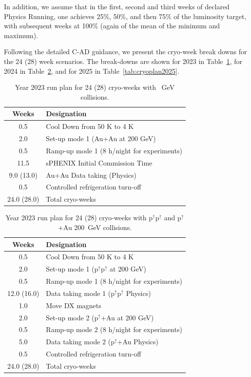 In addition, we assume that in the first, second and third weeks of declared Physics Running, one achieves 25\%, 50\%, and then 75\% of the luminosity target, with subsequent weeks at 100\% (again of the mean of the minimum and maximum).

Following the detailed C-AD guidance, we present the cryo-week break downs for the 24 (28) week scenarios.   
The break-downs are shown for 2023 in Table~\ref{tab:cryoplan2023}, for 2024 in Table~\ref{tab:cryoplan2024}, and for
2025 in Table~\ref{tab:cryoplan2025}.

\begin{table}
\centering
\begin{tabular}{ | c | l | }
\hline
Weeks & Designation \\ \hline
0.5  & Cool Down from 50 K to 4 K \\ \hline
2.0  & Set-up mode 1 (Au+Au at 200 GeV) \\ \hline
0.5  & Ramp-up mode 1 (8 h/night for experiments) \\ \hline
11.5  & sPHENIX Initial Commission Time \\ \hline
9.0 (13.0) & Au+Au Data taking (Physics) \\ \hline
0.5  & Controlled refrigeration turn-off \\ \hline \hline \hline
24.0 (28.0) & Total cryo-weeks \\
\hline
\end{tabular}
\caption{Year 2023 run plan for 24 (28) cryo-weeks with ~GeV collisions.\label{tab:cryoplan2023}}
\end{table}

\begin{table}
\centering
\begin{tabular}{ | c | l | }
\hline
Weeks & Designation \\ \hline
0.5  & Cool Down from 50 K to 4 K \\ \hline
2.0  & Set-up mode 1 (p$^{\uparrow}$p$^{\uparrow}$ at 200 GeV) \\ \hline
0.5  & Ramp-up mode 1 (8 h/night for experiments) \\ \hline
12.0 (16.0) & Data taking mode 1 (p$^{\uparrow}$p$^{\uparrow}$ Physics) \\ \hline
1.0  & Move DX magnets \\ \hline
2.0  & Set-up mode 2 (p$^{\uparrow}$+Au at 200 GeV) \\ \hline
0.5  & Ramp-up mode 2 (8 h/night for experiments) \\ \hline
5.0 & Data taking mode 2 (p$^{\uparrow}$+Au Physics) \\ \hline
0.5  & Controlled refrigeration turn-off \\ \hline \hline \hline
24.0 (28.0) & Total cryo-weeks \\
\hline
\end{tabular}
\caption{Year 2023 run plan for 24 (28) cryo-weeks with p$^{\uparrow}$p$^{\uparrow}$ and p$^{\uparrow}$+Au 200~GeV collisions.\label{tab:cryoplan2024}}
\end{table}

